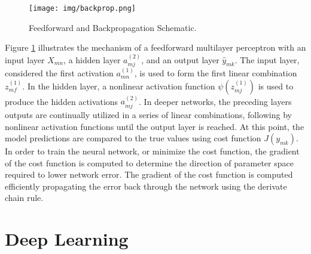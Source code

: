 
\begin{figure}[h!]
    \centering
    \texttt{[image: img/backprop.png]}
    \caption{Feedforward and Backpropagation Schematic.}
    \label{fig:backprop}
\end{figure}


\noindent
Figure \ref{fig:backprop} illustrates the mechanism of a feedforward multilayer perceptron with an input layer $X_{mn}$, a hidden layer $a_{mj}^{(2)}$, and an output layer $\hat{y}_{mk}$. The input layer, considered the first activation $a_{mn}^{(1)}$, is used to form the first linear combination $z_{mf}^{(1)}$. In the hidden layer, a nonlinear activation function $\psi(z_{mj}^{(1)})$ is used to produce the hidden activations $a_{mj}^{(2)}$. In deeper networks, the preceding layers outputs are continually utilized in a series of linear combinations, following by nonlinear activation functions until the output layer is reached. At this point, the model predictions are compared to the true values using cost function $J(\hat{y_{mk}})$. In order to train the neural network, or minimize the cost function, the gradient of the cost function is computed to determine the direction of parameter space required to lower network error. The gradient of the cost function is computed efficiently propagating the error back through the network using the derivate chain rule. 




\section{Deep Learning} \label{sec:deeplearning}

